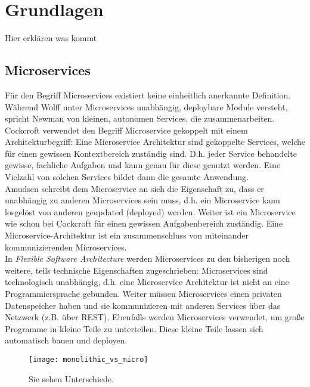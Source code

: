 
\section{Grundlagen}

Hier erklären was kommt

\subsection{Microservices}

Für den Begriff Microservices existiert keine einheitlich anerkannte Definition. Während Wolff unter Microservices unabhängig, deploybare Module versteht, spricht Newman von kleinen, autonomen Services, die zusammenarbeiten. Cockcroft verwendet den Begriff Microservice gekoppelt mit einem Architekturbegriff: Eine Microservice Architektur sind gekoppelte Services, welche für einen gewissen Kontextbereich zuständig sind. D.h. jeder Service behandelte gewisse, fachliche Aufgaben und kann genau für diese genutzt werden. Eine Vielzahl von solchen Services bildet dann die gesamte Anwendung. \\

Amudsen schreibt dem Microservice an sich die Eigenschaft zu, dass er unabhängig zu anderen Microservices sein muss, d.h. ein Microservice kann losgelöst von anderen geupdated (deployed) werden. Weiter ist ein Microservice wie schon bei Cockcroft für einen gewissen Aufgabenbereich zuständig. Eine Microservice-Architektur ist ein zusammenschluss von miteinander kommunizierenden Microservices. \\

In \textit{Flexible Software Architecture} werden Microservices zu den bisherigen noch weitere, teils technische Eigenschaften zugeschrieben: Microservices sind technologisch unabhängig, d.h. eine Microservice Architektur ist nicht an eine Programmiersprache gebunden. Weiter müssen Microservices einen privaten Datenspeicher haben und sie kommunizieren mit anderen Services über das Netzwerk (z.B. über REST). Ebenfalls werden Microservices verwendet, um große Programme in kleine Teile zu unterteilen. Diese kleine Teile lassen sich automatisch bauen und deployen.  

%
%

\begin{figure}[ht]
	\centering
	\texttt{[image: monolithic\_vs\_micro]}
	\caption{Sie sehen Unterschiede.\cite{irakli2016mic_arc}}
	\label{fig:trigo_funk}
\end{figure}